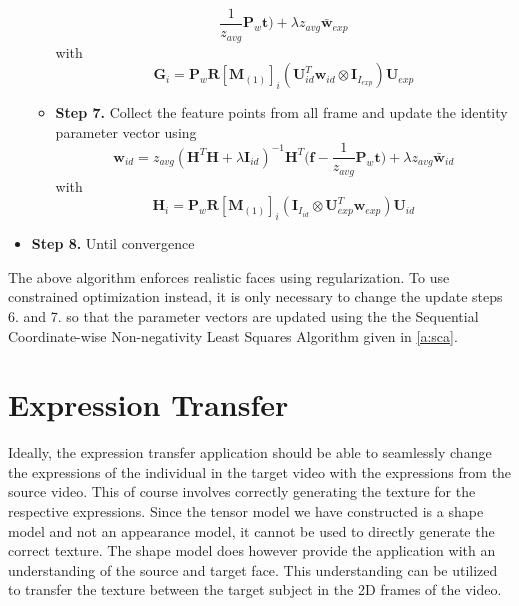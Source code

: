 \documentclass[11pt,a4paper]{report}
\begin{document}
\begin{itemize}
\begin{itemize}
\begin{equation*}
\frac{1}{z_{avg}}\mathbf{P}_w\mathbf{t}\bigr) + \lambda z_{avg}\mathbf{\bar{w}}_{exp}
\end{equation*}
with 
\begin{equation*}
\mathbf{G}_i =
\mathbf{P}_w\mathbf{R}[\mathbf{M}_{(1)}]_{i}(\mathbf{U}_{id}^T\mathbf{w}_{id}
\otimes \mathbf{I}_{I_{exp}})\mathbf{U}_{exp}
\end{equation*}
\item[\textbullet] \textbf{Step 7.} Collect the feature points from all frame
  and update the identity parameter vector using 
\begin{equation*}
\mathbf{w}_{id} =z_{avg}(\mathbf{H}^T\mathbf{H} + \lambda\mathbf{I}_{id})^{-1}\mathbf{H}^T\bigl(\mathbf{f}
- \frac{1}{z_{avg}}\mathbf{P}_w\mathbf{t}\bigr) + \lambda z_{avg}\mathbf{\bar{w}}_{id}
\end{equation*}
with
\begin{equation*}
\mathbf{H}_i = \mathbf{P}_w\mathbf{R}[\mathbf{M}_{(1)}]_{i}(\mathbf{I}_{I_{id}}
\otimes \mathbf{U}_{exp}^T\mathbf{w}_{exp})\mathbf{U}_{id}
\end{equation*}
\end{itemize}
\item \textbf{Step 8.} Until convergence 
\end{itemize}
The above algorithm enforces realistic faces using
regularization. To use constrained optimization instead, it is only necessary to
change the update steps 6. and 7. so that the parameter vectors are updated using
the the Sequential Coordinate-wise Non-negativity Least Squares Algorithm given
in \ref{a:sca}.

\section{Expression Transfer}
Ideally, the expression transfer application should be able to seamlessly change
the expressions of the individual in the target video with the expressions from
the source video. This of course involves correctly generating the texture for
the respective expressions. Since the tensor model we have constructed is a
shape model and not an appearance model, it cannot be used to directly generate
the correct texture. The shape model does however provide the application with an
understanding of the source and target face. This understanding can be utilized
to transfer the texture between the target subject in the 2D frames of the
video.
\end{document}
